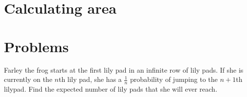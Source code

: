 \documentclass[mast]{lucky}
\begin{document}
\section{Calculating area}

\section{Problems}
\noindent{}

\begin{prob}[SMT 2021]{2}
Farley the frog starts at the first lily pad in an infinite row of lily pads. If she is currently on the $n$th lily pad, she has a $\frac{1}{n}$ probability of jumping to the $n+1$th lilypad. Find the expected number of lily pads that she will ever reach.
\end{prob}
\end{document}
